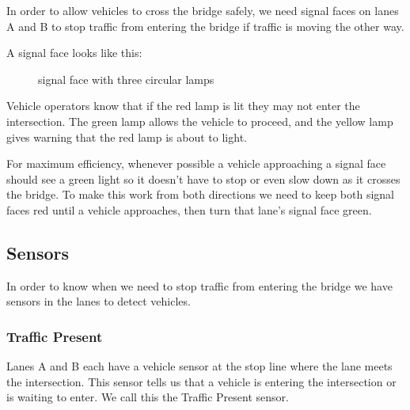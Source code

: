 \documentclass[letterpaper,twoside]{article}
\begin{document}
In order to allow vehicles to cross the bridge safely, we need signal
faces on lanes A and B to stop traffic from entering the bridge if
traffic is moving the other way.

A signal face looks like this:

\begin{figure}[H]
           {\caption{signal face with three circular lamps}
             \label{fig:signal_ccc}}
\end{figure}

Vehicle operators know that if the red lamp is lit they may not
enter the intersection.  The green lamp allows the vehicle to
proceed, and the yellow lamp gives warning that the red lamp
is about to light.

For maximum efficiency, whenever possible a vehicle approaching
a signal face should see a green light so it doesn't have to
stop or even slow down as it crosses the bridge.  To make this
work from both directions we need to keep both signal faces red
until a vehicle approaches, then turn that lane's signal face
green.

\subsection{Sensors}

In order to know when we need to stop traffic from entering the bridge
we have sensors in the lanes to detect vehicles.

\subsubsection{Traffic Present}

Lanes A and B each
have a vehicle sensor at the stop line where the lane meets the
intersection.  This sensor tells us that a vehicle is entering
the intersection or is waiting to enter.  We call this the Traffic
Present sensor.
\end{document}
